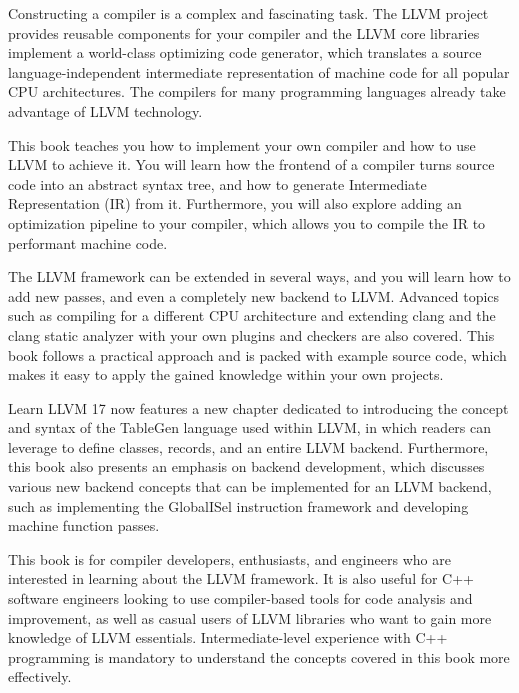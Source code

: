 Constructing a compiler is a complex and fascinating task. The LLVM project provides reusable components for your compiler and the LLVM core libraries implement a world-class optimizing code generator, which translates a source language-independent intermediate representation of machine code for all popular CPU architectures. The compilers for many programming languages already take advantage of LLVM technology.

This book teaches you how to implement your own compiler and how to use LLVM to achieve it. You will learn how the frontend of a compiler turns source code into an abstract syntax tree, and how to generate Intermediate Representation (IR) from it. Furthermore, you will also explore adding an optimization pipeline to your compiler, which allows you to compile the IR to performant machine code.

The LLVM framework can be extended in several ways, and you will learn how to add new passes, and even a completely new backend to LLVM. Advanced topics such as compiling for a different CPU architecture and extending clang and the clang static analyzer with your own plugins and checkers are also covered. This book follows a practical approach and is packed with example source code, which makes it easy to apply the gained knowledge within your own projects.


Learn LLVM 17 now features a new chapter dedicated to introducing the concept and syntax of the TableGen language used within LLVM, in which readers can leverage to define classes, records, and an entire LLVM backend. Furthermore, this book also presents an emphasis on backend development, which discusses various new backend concepts that can be implemented for an LLVM backend, such as implementing the GlobalISel instruction framework and developing machine function passes.


This book is for compiler developers, enthusiasts, and engineers who are interested in learning about the LLVM framework. It is also useful for C++ software engineers looking to use compiler-based tools for code analysis and improvement, as well as casual users of LLVM libraries who want to gain more knowledge of LLVM essentials. Intermediate-level experience with C++ programming is mandatory to understand the concepts covered in this book more effectively.


